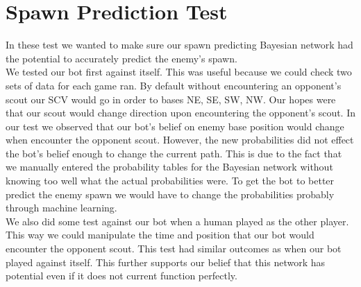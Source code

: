 \section{Spawn Prediction Test}
In these test we wanted to make sure our spawn predicting Bayesian network had the potential to accurately predict the enemy's spawn.
\\
We tested our bot first against itself. This was useful because we could check two sets of data for each game ran. By default without encountering an opponent's scout our SCV would go in order to bases NE, SE, SW, NW. Our hopes were that our scout would change direction upon encountering the opponent's scout. In our test we observed that our bot's belief on enemy base position would change when encounter the opponent scout. However, the new probabilities did not effect the bot's belief enough to change the current path. This is due to the fact that we manually entered the probability tables for the Bayesian network without knowing too well what the actual probabilities were. To get the bot to better predict the enemy spawn we would have to change the probabilities probably through machine learning. 
\\
We also did some test against our bot when a human played as the other player. This way we could manipulate the time and position that our bot would encounter the opponent scout. This test had similar outcomes as when our bot played against itself. This further supports our belief that this network has potential even if it does not current function perfectly.

